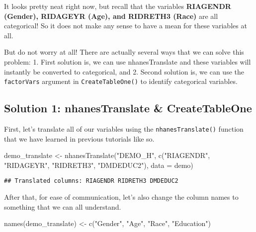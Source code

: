 \documentclass[
]{book}
\newenvironment{Shaded}{\begin{snugshade}}{\end{snugshade}}
\newcommand{\AttributeTok}[1]{\textcolor[rgb]{0.77,0.63,0.00}{#1}}
\newcommand{\FunctionTok}[1]{\textcolor[rgb]{0.00,0.00,0.00}{#1}}
\newcommand{\NormalTok}[1]{#1}
\newcommand{\OtherTok}[1]{\textcolor[rgb]{0.56,0.35,0.01}{#1}}
\newcommand{\StringTok}[1]{\textcolor[rgb]{0.31,0.60,0.02}{#1}}
\begin{document}
It looks pretty neat right now, but recall that the variables \textbf{RIAGENDR (Gender), RIDAGEYR (Age), and RIDRETH3 (Race)} are all categorical! So it does not make any sense to have a mean for these variables at all.

But do not worry at all! There are actually several ways that we can solve this problem:
1. First solution is, we can use nhanesTranslate and these variables will instantly be converted to categorical, and
2. Second solution is, we can use the \texttt{factorVars} argument in \texttt{CreateTableOne()} to identify categorical variables.

\hypertarget{solution-1-nhanestranslate-createtableone}{%
\subsection{Solution 1: nhanesTranslate \& CreateTableOne}\label{solution-1-nhanestranslate-createtableone}}

First, let's translate all of our variables using the \texttt{nhanesTranslate()} function that we have learned in previous tutorials like so.

\begin{Shaded}
\begin{Highlighting}[]
\NormalTok{demo\_translate }\OtherTok{\textless{}{-}} \FunctionTok{nhanesTranslate}\NormalTok{(}\StringTok{"DEMO\_H"}\NormalTok{,}
                 \FunctionTok{c}\NormalTok{(}\StringTok{"RIAGENDR"}\NormalTok{,}
                   \StringTok{"RIDAGEYR"}\NormalTok{,}
                   \StringTok{"RIDRETH3"}\NormalTok{, }
                   \StringTok{"DMDEDUC2"}\NormalTok{),}
                   \AttributeTok{data =}\NormalTok{ demo)}
\end{Highlighting}
\end{Shaded}

\begin{verbatim}
## Translated columns: RIAGENDR RIDRETH3 DMDEDUC2
\end{verbatim}

After that, for ease of communication, let's also change the column names to something that we can all understand.

\begin{Shaded}
\begin{Highlighting}[]
\FunctionTok{names}\NormalTok{(demo\_translate) }\OtherTok{\textless{}{-}} \FunctionTok{c}\NormalTok{(}\StringTok{"Gender"}\NormalTok{, }\StringTok{"Age"}\NormalTok{, }\StringTok{"Race"}\NormalTok{, }\StringTok{"Education"}\NormalTok{)}
\end{Highlighting}
\end{Shaded}
\end{document}
